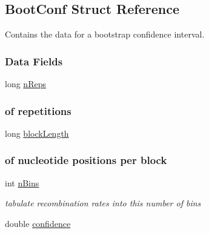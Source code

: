 \hypertarget{struct_boot_conf}{\subsection{Boot\+Conf Struct Reference}
\label{struct_boot_conf}
}


Contains the data for a bootstrap confidence interval.  


\subsubsection*{Data Fields}
\begin{DoxyCompactItemize}
\item 
\hypertarget{struct_boot_conf_ad7d61e383dfef5ae24ec8dea59feda3d}{long \hyperlink{struct_boot_conf_ad7d61e383dfef5ae24ec8dea59feda3d}{n\+Reps}}\label{struct_boot_conf_ad7d61e383dfef5ae24ec8dea59feda3d}

\begin{DoxyCompactList}\small\item\em \subsubsection*{of repetitions}\end{DoxyCompactList}\item 
\hypertarget{struct_boot_conf_abd095b45e3b74b9da1abad14d9abf501}{long \hyperlink{struct_boot_conf_abd095b45e3b74b9da1abad14d9abf501}{block\+Length}}\label{struct_boot_conf_abd095b45e3b74b9da1abad14d9abf501}

\begin{DoxyCompactList}\small\item\em \subsubsection*{of nucleotide positions per block}\end{DoxyCompactList}\item 
\hypertarget{struct_boot_conf_a3d42d32697c1d9f7371b4fdc75c7ab7a}{int \hyperlink{struct_boot_conf_a3d42d32697c1d9f7371b4fdc75c7ab7a}{n\+Bins}}\label{struct_boot_conf_a3d42d32697c1d9f7371b4fdc75c7ab7a}

\begin{DoxyCompactList}\small\item\em tabulate recombination rates into this number of bins \end{DoxyCompactList}\item 
\hypertarget{struct_boot_conf_a755fb4fbfa8e079445e1c6a8298446f9}{double \hyperlink{struct_boot_conf_a755fb4fbfa8e079445e1c6a8298446f9}{confidence}}\label{struct_boot_conf_a755fb4fbfa8e079445e1c6a8298446f9}


\end{DoxyCompactItemize}
